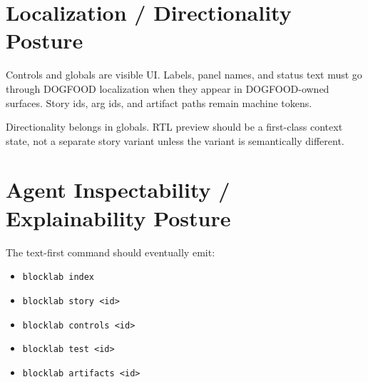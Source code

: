 \section{Localization / Directionality Posture}\label{record-135-localization-directionality-posture}

Controls and globals are visible UI. Labels, panel names, and status text must go through DOGFOOD localization when they appear in DOGFOOD-owned surfaces. Story ids, arg ids, and artifact paths remain machine tokens.

Directionality belongs in globals. RTL preview should be a first-class context state, not a separate story variant unless the variant is semantically different.

\section{Agent Inspectability / Explainability Posture}\label{record-135-agent-inspectability-explainability-posture}

The text-first command should eventually emit:

\begin{itemize}
\tightlist
\item
  \texttt{b\allowbreak{}l\allowbreak{}o\allowbreak{}c\allowbreak{}k\allowbreak{}l\allowbreak{}a\allowbreak{}b\allowbreak{} \allowbreak{}i\allowbreak{}n\allowbreak{}d\allowbreak{}e\allowbreak{}x}
\item
  \texttt{b\allowbreak{}l\allowbreak{}o\allowbreak{}c\allowbreak{}k\allowbreak{}l\allowbreak{}a\allowbreak{}b\allowbreak{} \allowbreak{}s\allowbreak{}t\allowbreak{}o\allowbreak{}r\allowbreak{}y\allowbreak{} \allowbreak{}<\allowbreak{}i\allowbreak{}d\allowbreak{}>}
\item
  \texttt{b\allowbreak{}l\allowbreak{}o\allowbreak{}c\allowbreak{}k\allowbreak{}l\allowbreak{}a\allowbreak{}b\allowbreak{} \allowbreak{}c\allowbreak{}o\allowbreak{}n\allowbreak{}t\allowbreak{}r\allowbreak{}o\allowbreak{}l\allowbreak{}s\allowbreak{} \allowbreak{}<\allowbreak{}i\allowbreak{}d\allowbreak{}>}
\item
  \texttt{b\allowbreak{}l\allowbreak{}o\allowbreak{}c\allowbreak{}k\allowbreak{}l\allowbreak{}a\allowbreak{}b\allowbreak{} \allowbreak{}t\allowbreak{}e\allowbreak{}s\allowbreak{}t\allowbreak{} \allowbreak{}<\allowbreak{}i\allowbreak{}d\allowbreak{}>}
\item
  \texttt{b\allowbreak{}l\allowbreak{}o\allowbreak{}c\allowbreak{}k\allowbreak{}l\allowbreak{}a\allowbreak{}b\allowbreak{} \allowbreak{}a\allowbreak{}r\allowbreak{}t\allowbreak{}i\allowbreak{}f\allowbreak{}a\allowbreak{}c\allowbreak{}t\allowbreak{}s\allowbreak{} \allowbreak{}<\allowbreak{}i\allowbreak{}d\allowbreak{}>}
\end{itemize}

